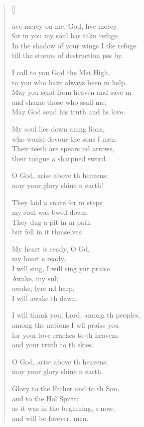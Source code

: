 \settowidth{\versewidth}{I will thank you, Lord, among the peoples, *}
\begin{verse}[\versewidth]
  \begin{patverse}
    ave mercy on me, God, hve mercy\Med\\
for in you my soul has takn refuge.\\
In the shadow of your wings I tke refuge\Med\\
till the storms of destruction pss by.

I call to you God the Mst High,\Med\\
to you who have always been m help.\\
May you send from heaven and save m\Flex\\
and shame those who ssail me.\Med\\
May God send his truth and h\pointup{\i}s love.

My soul lies down amng lions,\Med\\
who would devour the sons f men.\\
Their teeth are spears nd arrows,\Med\\
their tongue a sharpned sword.

O God, arise above th heavens;\Med\\
may your glory shine n earth!

They laid a snare for m steps\Med\\
my soul was bwed down.\\
They dug a pit in m path\Med\\
but fell in it thmselves.

My heart is ready, O Gd,\Flex\\
my heart \pointup{\i}s ready.\Med\\
I will sing, I will sing yur praise.\\
Awake, my sul;\Flex\\
awake, lyre nd harp,\Med\\
I will awake th dawn.

I will thank you, Lord, among th peoples,\Med\\
among the nations I w\pointup{\i}ll praise you\\
for your love reaches to th heavens\Med\\
and your truth to th skies.

O God, arise above th heavens;\Med\\
may your glory shine n earth.

Glory to the Father and to th Son,\Med\\
and to the Hol Spirit:\\
as it was in the beginning, \pointup{\i}s now,\Med\\
and will be forever. men. 
  \end{patverse}
\end{verse}
